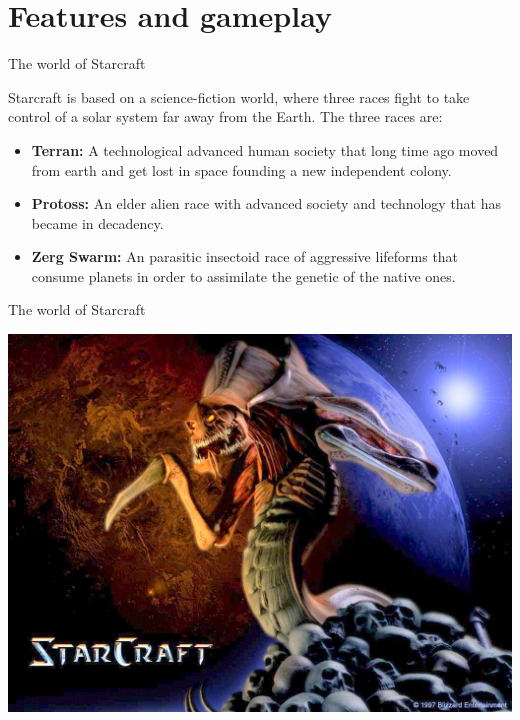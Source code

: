 \documentclass[10pt]{beamer}
\begin{document}
\section{Features and gameplay}

\begin{frame}{The world of Starcraft}

Starcraft is based on a science-fiction world, where three races fight to take control of a solar system far away from the Earth. The three races are:

    \begin{itemize}
     \item \textbf{Terran:} A technological advanced human society that long time ago moved from earth and get lost in space founding a new independent colony.
     \item \textbf{Protoss:} An elder alien race with advanced society and technology that has became in decadency.
     \item \textbf{Zerg Swarm:} An parasitic insectoid race of aggressive lifeforms that consume planets in order to assimilate the genetic of the native ones.
    \end{itemize}

\end{frame}

\begin{frame}{The world of Starcraft}

\begin{center}
	  \includegraphics[scale=0.3]{hydralisk.jpg}\end{center}

\end{frame}
\end{document}
